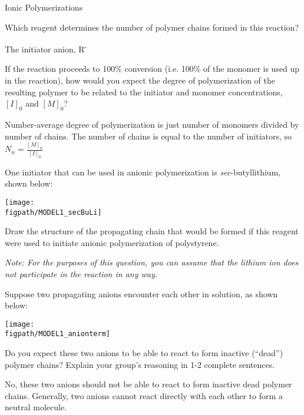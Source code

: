 \begin{activity}{Ionic Polymerizations}
\begin{ctqs}
	
	\question Which reagent determines the number of polymer chains formed in this reaction?
	
		\begin{solution}[0.25in]
			The initiator anion, R\textsuperscript{-}
		\end{solution}
	
	\question If the reaction proceeds to 100\% conversion (i.e. 100\% of the monomer is used up in the reaction), how would you expect the degree of polymerization of the resulting polymer to be related to the initiator and monomer concentrations, $[I]_0$ and $[M]_0$?
	
		\begin{solution}[0.5in]
			Number-average degree of polymerization is just number of monomers divided by number of chains.  The number of chains is equal to the number of initiators, so $N_n = \frac{[M]_0}{[I]_0}$
		\end{solution}
	
	\question One initiator that can be used in anionic polymerization is \emph{sec}-butyllithium, shown below:
	 \label{\labelbase:ctq:ps-anionic-prop}
	
	\centerline{\texttt{[image: \\figpath/MODEL1\_secBuLi]}}
	 	
	 	Draw the structure of the propagating chain that would be formed if this reagent were used to initiate anionic polymerization of polystyrene.
	 	
	 	\emph{Note: For the purposes of this question, you can assume that the lithium ion does not participate in the reaction in any way.}
	
		\begin{solution}[1in]
		\studentdisplay{}
		\end{solution}
	
	\question Suppose two propagating anions encounter each other in solution, as shown below:
	
	\centerline{\texttt{[image: \\figpath/MODEL1\_anionterm]}}
	
		Do you expect these two anions to be able to react to form inactive (``dead'') polymer chains?  Explain your group's reasoning in 1-2 complete sentences.
	
		\begin{solution}[1.25in]
			No, these two anions should not be able to react to form inactive dead polymer chains.  Generally, two anions cannot react directly with each other to form a neutral molecule.
		\end{solution}
	

\end{ctqs}
\end{activity}
